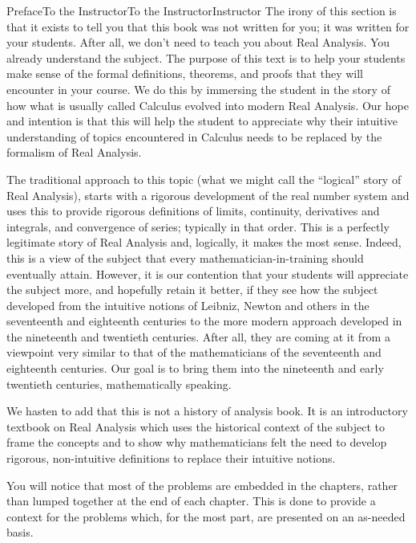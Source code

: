 \documentclass[oneside,10pt,]{book}
\numberwithin{equation}{part}
\begin{document}
\begin{preface}{Preface}{To the Instructor}{}{To the Instructor}{}{}{Instructor}
The irony of this section is that it exists to tell you that this book was not written for you; it was written for your students. After all, we don't need to teach you about Real Analysis.  You already understand the subject.  The purpose of this text is to help your students make sense of the formal definitions, theorems, and proofs that they will encounter in your course.  We do this by immersing the student in the story of how what is usually called Calculus evolved into modern Real Analysis.  Our hope and intention is that this will help the student to appreciate why their intuitive understanding of topics encountered in Calculus needs to be replaced by the formalism of Real Analysis.%
\par
The traditional approach to this topic (what we might call the ``logical'' story of Real Analysis), starts with a rigorous development of the real number system and uses this to provide rigorous definitions of limits, continuity, derivatives and integrals, and convergence of series; typically in that order. This is a perfectly legitimate story of Real Analysis and, logically, it makes the most sense.  Indeed, this is a view of the subject that every mathematician-in-training should eventually attain.  However, it is our contention that your students will appreciate the subject more, and hopefully retain it better, if they see how the subject developed from the intuitive notions of Leibniz, Newton and others in the seventeenth and eighteenth centuries to the more modern approach developed in the nineteenth and twentieth centuries.  After all, they are coming at it from a viewpoint very similar to that of the mathematicians of the seventeenth and eighteenth centuries.  Our goal is to bring them into the nineteenth and early twentieth centuries, mathematically speaking.%
\par
We hasten to add that this is not a history of analysis book.  It is an introductory textbook on Real Analysis which uses the historical context of the subject to frame the concepts and to show why mathematicians felt the need to develop rigorous, non-intuitive definitions to replace their intuitive notions.%
\par
You will notice that most of the problems are embedded in the chapters, rather than lumped together at the end of each chapter. This is done to provide a context for the problems which, for the most part, are presented on an as-needed basis.%
\par

\end{preface}
\end{document}
